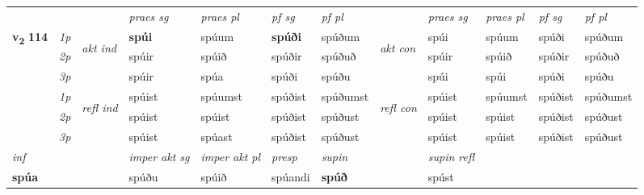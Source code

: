 \begin{longtable}[l]{X>{\footnotesize\itshape}llXXXXlXXXX}
\midrule

 & &   & \textit{praes sg}  & \textit{praes pl}    & \textit{ pf sg} & \textit{pf pl} & & \textit{praes sg}  & \textit{praes pl}    & \textit{pf sg} & \textit{pf pl }  \\ \cmidrule{4-7} \cmidrule{9-12}
 \multirow{2}{*}{{{\textbf{v{\textsubscript{2}}} \Large{\textbf{114}}}}}  & 1p & \multirow{3}{*}{\begin{turn}{90}\textit{akt ind}\end{turn}} & \textbf{spúi} & spúum & \textbf{spúði} & spúðum & \multirow{3}{*}{\begin{turn}{90}\textit{akt con}\end{turn}} &spúi & spúum & spúði & spúðum\\*
 & 2p &  &  spúir  & spúið & spúðir & spúðuð & & spúir & spúið & spúðir & spúðuð \\*
 & 3p &  & spúir & spúa & spúði & spúðu & & spúi & spúi& spúði & spúðu \\*
\cmidrule{4-7} \cmidrule{9-12}
 & 1p & \multirow{3}{*}{\begin{turn}{90}\textit{refl ind}\end{turn}}  & spúist & spúumst & spúðist & spúðumst & \multirow{3}{*}{\begin{turn}{90}\textit{refl con}\end{turn}}  &spúist & spúumst & spúðist & spúðumst \\*
 & 2p &  & spúist & spúist & spúðist & spúðust & &spúist & spúist & spúðist & spúðust \\*
 & 3p  & & spúist & spúast & spúðist & spúðust & & spúist & spúist& spúðist & spúðust \\*
\cmidrule{4-7} \cmidrule{9-12}

   {\textit{inf}} & &  & \textit{imper akt sg} & \textit{imper akt pl}   & \textit{presp} & \textit{supin} && \textit{supin refl}  \\*
  {\textbf{spúa}} & && spúðu  & spúið   & spúandi &  \textbf{spúð} && spúst  \\*

\midrule


\end{longtable}
